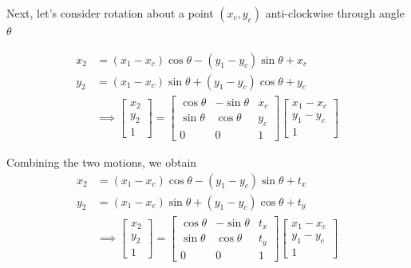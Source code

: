 \documentclass{report}
\begin{document}
Next, let's consider rotation about a point $(x_c,y_c)$ anti-clockwise through angle $\theta$

\begin{align}
  x_2 & = (x_1-x_c)\cos\theta - (y_1-y_c)\sin\theta + x_c \\
  y_2 & = (x_1-x_c)\sin\theta + (y_1-y_c)\cos\theta + y_c \\
      & \implies \begin{bmatrix}
                   x_2 \\
                   y_2 \\
                   1
                 \end{bmatrix}
  = \begin{bmatrix}
      \cos\theta & -\sin\theta & x_c \\
      \sin\theta & \cos\theta  & y_c \\
      0          & 0           & 1
    \end{bmatrix} \begin{bmatrix}
                    x_1-x_c \\
                    y_1-y_c \\
                    1
                  \end{bmatrix}
\end{align}

Combining the two motions, we obtain
\begin{align}
  x_2 & = (x_1-x_c)\cos\theta - (y_1-y_c)\sin\theta + t_x \\
  y_2 & = (x_1-x_c)\sin\theta + (y_1-y_c)\cos\theta + t_y \\
      & \implies \begin{bmatrix}
                   x_2 \\
                   y_2 \\
                   1
                 \end{bmatrix}
  = \begin{bmatrix}
      \cos\theta & -\sin\theta & t_x \\
      \sin\theta & \cos\theta  & t_y \\
      0          & 0           & 1
    \end{bmatrix} \begin{bmatrix}
                    x_1-x_c \\
                    y_1-y_c \\
                    1
                  \end{bmatrix}
\end{align}
\end{document}
